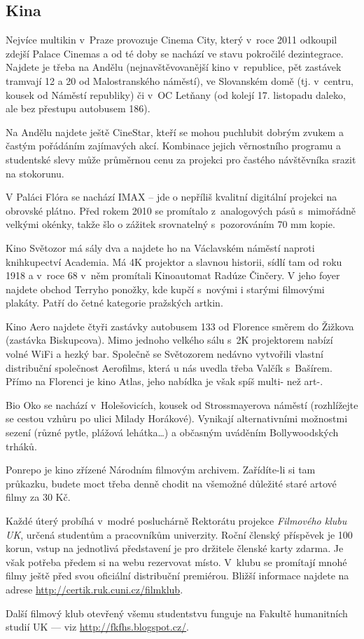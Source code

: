 \subsection{Kina}


Nejvíce multikin v~Praze provozuje Cinema City, který v~roce 2011 odkoupil zdejší Palace Cinemas a od té doby se nachází ve stavu pokročilé dezintegrace. Najdete je třeba na Andělu (nejnavštěvovanější kino v~republice, pět zastávek tramvají 12 a 20 od Malostranského náměstí), ve Slovanském domě (tj. v~centru, kousek od Náměstí republiky) či v~OC Letňany (od kolejí 17. listopadu daleko, ale bez přestupu autobusem 186).

Na Andělu najdete ještě CineStar, kteří se mohou puchlubit dobrým zvukem a častým pořádáním zajímavých akcí. Kombinace jejich věrnostního programu a studentské slevy může průměrnou cenu za projekci pro častého návštěvníka srazit na stokorunu.

V Paláci Flóra se nachází IMAX – jde o nepříliš kvalitní digitální projekci na obrovské plátno. Před rokem 2010 se promítalo z~analogových pásů s~mimořádně velkými okénky, takže šlo o zážitek srovnatelný s~pozorováním 70 mm kopie.


Kino Světozor má sály dva a najdete ho na Václavském náměstí
naproti knihkupectví Academia. Má 4K projektor a slavnou historii,
sídlí tam od roku 1918 a v~roce 68 v~něm promítali Kinoautomat
Radúze Činčery. V jeho foyer najdete obchod Terryho ponožky, kde
kupčí s~novými i starými filmovými plakáty. Patří do četné
kategorie pražských artkin.

Kino Aero najdete čtyři zastávky autobusem 133 od Florence směrem
do Žižkova (zastávka Biskupcova). Mimo jednoho velkého sálu s~2K
projektorem nabízí volné WiFi a hezký bar. Společně se Světozorem
nedávno vytvořili vlastní distribuční společnost Aerofilms, která
u nás uvedla třeba Valčík s~Bašírem. Přímo na Florenci je kino
Atlas, jeho nabídka je však spíš multi- než art-.

Bio Oko se nachází v~Holešovicích, kousek od Strossmayerova
náměstí (rozhlížejte se cestou vzhůru po ulici Milady Horákové).
Vynikají alternativními možnostmi sezení (různé pytle, plážová
lehátka\dots) a občasným uváděním Bo\-lly\-woo\-dských trháků.

Ponrepo je kino zřízené Národním filmovým archivem. Zařídíte-li si tam průkazku, budete moct třeba denně chodit na všemožné důležité staré artové filmy za 30 Kč.

Každé úterý probíhá v~modré posluchárně Rektorátu projekce {\it
Filmového klubu UK}, určená studentům a pracovníkům univerzity.
Roční členský příspěvek je 100 korun, vstup na jednotlivá
představení je pro držitele členské karty zdarma. Je však potřeba
předem si na webu rezervovat místo. V~klubu se promítají mnohé
filmy ještě před svou oficiální distribuční premiérou. Bližší
informace najdete na adrese \url{http://certik.ruk.cuni.cz/filmklub}.

Další filmový klub otevřený všemu studentstvu funguje na Fakultě humanitních studií UK --- viz \url{http://fkfhs.blogspot.cz/}.